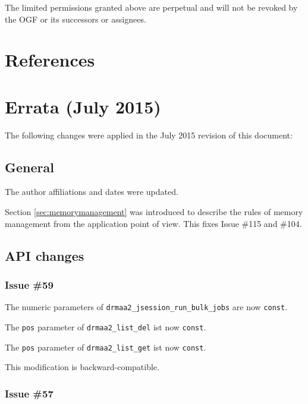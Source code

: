 \documentclass{article}
\begin{document}
 The limited permissions granted above are perpetual and will not be
 revoked by the OGF or its successors or assignees.


\section{References}
\renewcommand{\refname}{}
\vspace*{-3em}


\newpage
\appendix

\section{Errata (July 2015)}
\label{sec:errata}

The following changes were applied in the July 2015 revision of this document:

\subsection*{General}

The author affiliations and dates were updated.

Section \ref{sec:memorymanagement} was introduced to describe the rules of memory management from the application point of view. This fixes Issue \#115 and \#104.

\subsection*{API changes}

\subsubsection*{Issue \#59}

The numeric parameters of \lstinline{drmaa2_jsession_run_bulk_jobs} are now \lstinline{const}.

The \lstinline{pos} parameter of \lstinline{drmaa2_list_del} ist now \lstinline{const}.

The \lstinline{pos} parameter of \lstinline{drmaa2_list_get} ist now \lstinline{const}.

This modification is backward-compatible.

\subsubsection*{Issue \#57}
\end{document}
